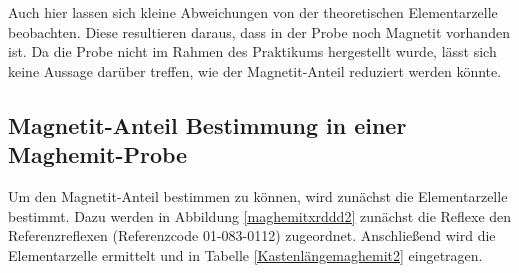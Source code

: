 \documentclass[12pt, a4paper]{article}
\begin{document}
\noindent
Auch hier lassen sich kleine Abweichungen von der theoretischen Elementarzelle beobachten. Diese resultieren daraus, dass in der Probe noch Magnetit vorhanden ist. Da die Probe nicht im Rahmen des Praktikums hergestellt wurde, lässt sich keine Aussage darüber treffen, wie der Magnetit-Anteil reduziert werden könnte.



\newpage



\subsection{Magnetit-Anteil Bestimmung in einer Maghemit-Probe}
Um den Magnetit-Anteil bestimmen zu können, wird zunächst die Elementarzelle bestimmt. Dazu werden in Abbildung \ref{maghemitxrddd2} zunächst die Reflexe den Referenzreflexen (Referenzcode 01-083-0112) zugeordnet. Anschließend wird die Elementarzelle ermittelt und in Tabelle \ref{Kastenlängemaghemit2} eingetragen.
\end{document}
